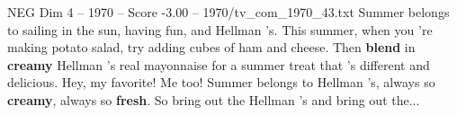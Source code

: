 \begin{textsample}{NEG Dim 4 – 1970 – Score -3.00 – 1970/tv\_com\_1970\_43.txt}  \label{ex:f4_neg_051}
Summer belongs to sailing in the sun, having fun, and Hellman 's.
This summer, when you 're making potato salad, try adding cubes of ham and cheese.
Then \textbf{blend} in \textbf{creamy} Hellman 's real mayonnaise for a summer treat that 's different and delicious.
Hey, my favorite!
Me too!
Summer belongs to Hellman 's, always so \textbf{creamy}, always so \textbf{fresh}.
So bring out the Hellman 's and bring out the...

\end{textsample}
